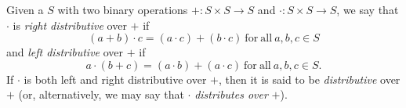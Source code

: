 \documentclass[12pt]{article}
\begin{document}
Given a  $S$ with two binary operations $+\colon S \times S \to S$ and $\cdot\colon S \times S \to S$, we say that $\cdot$ is {\em right distributive} over $+$ if
$$(a+b) \cdot c = (a \cdot c) + (b \cdot c)\mathrm{~for~all~} a,b,c \in S$$
and {\em left distributive} over $+$ if
$$a \cdot (b+c) = (a \cdot b) + (a \cdot c)\mathrm{~for~all~}a,b,c \in S.$$
If $\cdot$ is both left and right distributive over $+$, then it is said to be {\em distributive} over $+$ (or, alternatively, we may say that $\cdot$ {\em distributes over} $+$).
\end{document}
